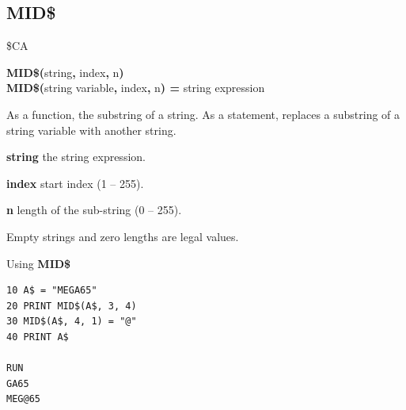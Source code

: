 \subsection{MID\$}
\begin{description}[leftmargin=2cm,style=nextline]
\item [Token:]    \$CA

\item [Format:]   {\bf MID\$(}string{\bf,} index{\bf,} n{\bf)} \\
                  {\bf MID\$(}string variable{\bf,} index{\bf,} n{\bf) =} string expression

\item [Usage:]    As a function, the substring of a string. As a statement, replaces a substring of a string variable with another string.

                  {\bf string} the string expression.

                  {\bf index} start index (1 -- 255).

                  {\bf n} length of the sub-string (0 -- 255).

\item [Remarks:]  Empty strings and zero lengths are legal values.

\item [Example:]  Using {\bf MID\$}

\begin{tcolorbox}[colback=black,coltext=white]
\verbatimfont{\codefont}
\begin{verbatim}
10 A$ = "MEGA65"
20 PRINT MID$(A$, 3, 4)
30 MID$(A$, 4, 1) = "@"
40 PRINT A$

RUN
GA65
MEG@65
\end{verbatim}
\end{tcolorbox}
\end{description}


\newpage
